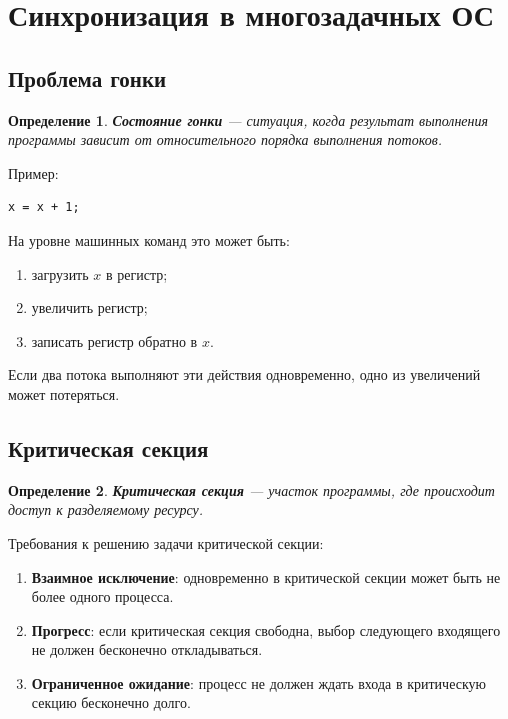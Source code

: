 \documentclass[12pt,a4paper]{article}
\newtheorem{definition}{Определение}
\begin{document}
\section{Синхронизация в многозадачных ОС}

\subsection{Проблема гонки}

\begin{definition}
\textbf{Состояние гонки} --- ситуация, когда результат выполнения программы зависит от относительного порядка выполнения потоков.
\end{definition}

Пример:

\begin{lstlisting}[style=code]
x = x + 1;
\end{lstlisting}

На уровне машинных команд это может быть:

\begin{enumerate}
    \item загрузить $x$ в регистр;
    \item увеличить регистр;
    \item записать регистр обратно в $x$.
\end{enumerate}

Если два потока выполняют эти действия одновременно, одно из увеличений может потеряться.

\subsection{Критическая секция}

\begin{definition}
\textbf{Критическая секция} --- участок программы, где происходит доступ к разделяемому ресурсу.
\end{definition}

Требования к решению задачи критической секции:

\begin{enumerate}
    \item \textbf{Взаимное исключение}: одновременно в критической секции может быть не более одного процесса.
    \item \textbf{Прогресс}: если критическая секция свободна, выбор следующего входящего не должен бесконечно откладываться.
    \item \textbf{Ограниченное ожидание}: процесс не должен ждать входа в критическую секцию бесконечно долго.
\end{enumerate}
\end{document}

